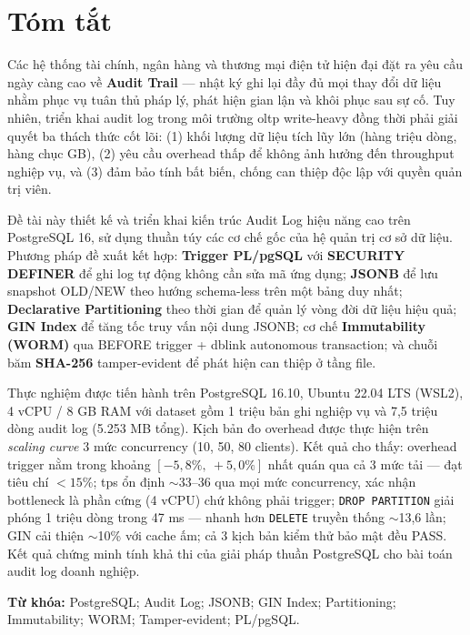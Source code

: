 \chapter*{Tóm tắt}

\begin{sloppypar}
Các hệ thống tài chính, ngân hàng và thương mại điện tử hiện đại đặt ra yêu cầu ngày càng cao về \textbf{Audit Trail} --- nhật ký ghi lại đầy đủ mọi thay đổi dữ liệu nhằm phục vụ tuân thủ pháp lý, phát hiện gian lận và khôi phục sau sự cố. Tuy nhiên, triển khai audit log trong môi trường \ac{oltp} write-heavy đồng thời phải giải quyết ba thách thức cốt lõi: (1) khối lượng dữ liệu tích lũy lớn (hàng triệu dòng, hàng chục GB), (2) yêu cầu overhead thấp để không ảnh hưởng đến throughput nghiệp vụ, và (3) đảm bảo tính bất biến, chống can thiệp độc lập với quyền quản trị viên.

Đề tài này thiết kế và triển khai kiến trúc Audit Log hiệu năng cao trên PostgreSQL 16, sử dụng thuần túy các cơ chế gốc của hệ quản trị cơ sở dữ liệu. Phương pháp đề xuất kết hợp: \textbf{Trigger PL/pgSQL} với \textbf{SECURITY DEFINER} để ghi log tự động không cần sửa mã ứng dụng; \textbf{JSONB} để lưu snapshot OLD/NEW theo hướng schema-less trên một bảng duy nhất; \textbf{Declarative Partitioning} theo thời gian để quản lý vòng đời dữ liệu hiệu quả; \textbf{GIN Index} để tăng tốc truy vấn nội dung JSONB; cơ chế \textbf{Immutability (WORM)} qua BEFORE trigger + dblink autonomous transaction; và chuỗi băm \textbf{SHA-256} tamper-evident để phát hiện can thiệp ở tầng file.

Thực nghiệm được tiến hành trên PostgreSQL 16.10, Ubuntu 22.04 LTS (WSL2), 4 vCPU / 8 GB RAM với dataset gồm 1 triệu bản ghi nghiệp vụ và 7,5 triệu dòng audit log (5.253 MB tổng). Kịch bản đo overhead được thực hiện trên \textit{scaling curve} 3 mức concurrency (10, 50, 80 clients). Kết quả cho thấy: overhead trigger nằm trong khoảng $[-5,8\%,\ +5,0\%]$ nhất quán qua cả 3 mức tải --- đạt tiêu chí $< 15\%$; \ac{tps} ổn định $\sim$33--36 qua mọi mức concurrency, xác nhận bottleneck là phần cứng (4 vCPU) chứ không phải trigger; \texttt{DROP\ PARTITION} giải phóng 1 triệu dòng trong 47 ms --- nhanh hơn \texttt{DELETE} truyền thống $\sim$13,6 lần; GIN cải thiện $\sim$10\% với cache ấm; cả 3 kịch bản kiểm thử bảo mật đều PASS. Kết quả chứng minh tính khả thi của giải pháp thuần PostgreSQL cho bài toán audit log doanh nghiệp.

\textbf{Từ khóa:} PostgreSQL; Audit Log; JSONB; GIN Index; Partitioning; Immutability; WORM; Tamper-evident; PL/pgSQL.
\end{sloppypar}
